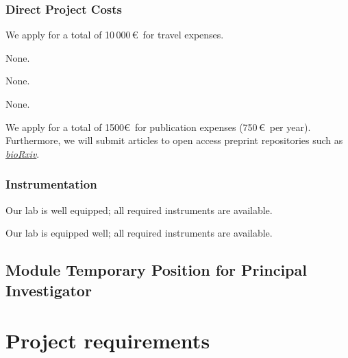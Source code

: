\documentclass{scrartcl}
\begin{document}
\subsubsection{Direct Project Costs}
\begin{funds}



We apply for a total of 10\,000\,\euro\ for travel expenses.

None.

None.

None.

We apply for a total of 1500\euro\ for publication expenses (750\,\euro\ per
year). Furthermore, we will submit articles to open access preprint repositories
such as \href{https://www.biorxiv.org/}{\textit{bioRxiv}}.

\end{funds}

\subsubsection{Instrumentation}

Our lab is well equipped; all required instruments are available.

Our lab is equipped well; all required instruments are available.

\subsection{Module Temporary Position for Principal Investigator}

\section{Project requirements}
\end{document}
